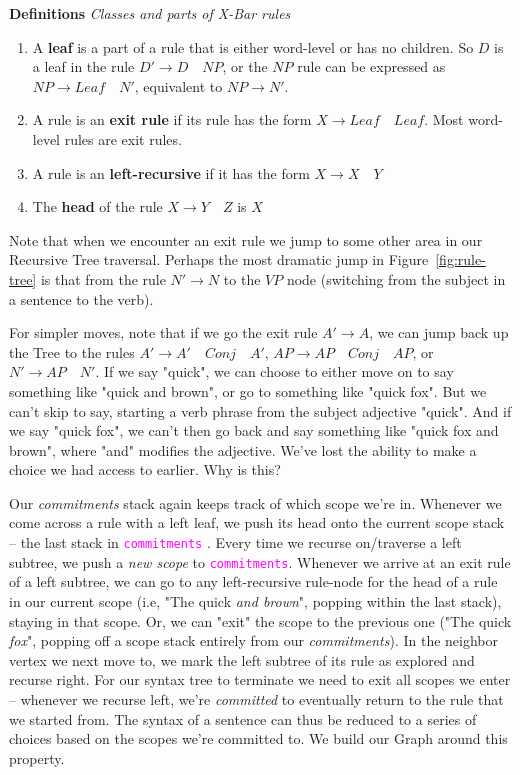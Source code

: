 \documentclass[runningheads]{llncs}
\newcommand{\code}[1]{\texttt{\textcolor{magenta}{\setlength{\fboxsep}{1pt}\colorbox{lightgray!20}{#1}}}}
\begin{document}
\begin{tcolorbox}[colframe=black,colback=white,boxrule=0.5pt,arc=2pt]
\textbf{Definitions} \textit{Classes and parts of X-Bar rules}
\begin{enumerate}
	\item A \textbf{leaf} is a part of a rule that is either word-level or has no children. So $D$ is a leaf in the rule $D' \rightarrow D \quad NP$, or the $NP$ rule can be expressed as $NP \rightarrow Leaf \quad N'$, equivalent to $NP \rightarrow N'$.
	\item A rule is an \textbf{exit rule} if its rule has the form $X \rightarrow Leaf \quad Leaf$. Most word-level rules are exit rules.
	\item A rule is an \textbf{left-recursive} if it has the form $X \rightarrow X \quad Y$
	\item The  \textbf{head} of the rule $X \rightarrow Y \quad Z$ is $X$
\end{enumerate}
\end{tcolorbox}

Note that when we encounter an exit rule we jump to some other area in our Recursive Tree traversal. Perhaps the most dramatic jump in Figure~\ref{fig:rule-tree} is that from the rule \mbox{$N' \rightarrow N$} to the $VP$ node (switching from the subject in a sentence to the verb).

For simpler moves, note that if we go the exit rule $A' \rightarrow  A$, we can jump back up the Tree to the rules \mbox{$A' \rightarrow A' \quad Conj \quad A'$}, \mbox{$AP \rightarrow AP \quad Conj \quad AP$}, or \mbox{$N' \rightarrow AP \quad N'$}. If we say "quick", we can choose to either move on to say something like "quick and brown", or go to something like "quick fox". But we can't skip to say, starting a verb phrase from the subject adjective "quick". And if we say "quick fox", we can't then go back and say something like "quick fox and brown", where "and" modifies the adjective. We've lost the ability to make a choice we had access to earlier. Why is this?

Our \textit{commitments} stack again keeps track of which scope we're in. Whenever we come across a rule with a left leaf, we push its head onto the current scope stack --  the last stack in \code{commitments} . Every time we recurse on/traverse a left subtree, we push a \textit{new scope} to \code{commitments}. Whenever we arrive at an exit rule of a left subtree, we can go to any left-recursive rule-node for the head of a rule in our current scope (i.e, "The quick \textit{and brown}", popping within the last stack), staying in that scope. Or, we can "exit" the scope to the previous one ("The quick \textit{fox}", popping off a scope stack entirely from our \textit{commitments}). In the neighbor vertex we next move to, we mark the left subtree of its rule as explored and recurse right. For our syntax tree to terminate we need to exit all scopes we enter -- whenever we recurse left, we're \textit{committed} to eventually return to the rule that we started from. The syntax of a sentence can thus be reduced to a series of choices based on the scopes we're committed to. We build our Graph around this property.
\end{document}
